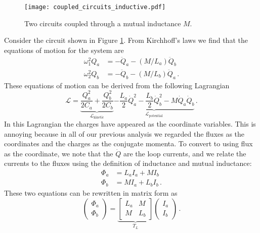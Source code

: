 
\begin{figure}
\begin{centering}
\texttt{[image: coupled\_circuits\_inductive.pdf]}
\par\end{centering}
\caption{Two circuits coupled through a mutual inductance $M$.}
\label{Fig:coupledCircuits_inductive}
\end{figure}

Consider the circuit shown in Figure \ref{Fig:coupledCircuits_inductive}.
From Kirchhoff's laws we find that the equations of motion for the system are
\begin{align}
  \omega_1^2 Q_a &= -\ddot{Q}_a - \left(M/L_a\right) \ddot{Q}_b \nonumber \\
  \omega_2^2 Q_b &= -\ddot{Q}_b - \left(M/L_b\right) \ddot{Q}_a
  \, .
\end{align}
These equations of motion can be derived from the following Lagrangian
\begin{equation}
  \mathcal{L} =
  \underbrace{
      \frac{Q_a^2}{2 C_a} + \frac{Q_b^2}{2 C_b}
  }_{\mathcal{L}_\text{kinetic}}
  \underbrace{
    - \frac{L_a}{2}\dot{Q}_a^2
    - \frac{L_b}{2}\dot{Q}_b^2
    - M \dot{Q}_a \dot{Q}_b
  }_{\mathcal{L}_\text{potential}}
  \, . \label{eq:sec.coupling.subsec.inductiveCoupling:Lagrangian}
\end{equation}
In this Lagrangian the charges have appeared as the coordinate variables.
This is annoying because in all of our previous analysis we regarded the fluxes as the coordinates and the charges as the conjugate momenta.
To convert to using flux as the coordinate, we note that the $\dot{Q}$ are the loop currents, and we relate the currents to the fluxes using the definition of inductance and mutual inductance:
\begin{align*}
  \Phi_a &= L_a I_a + M I_b \\
  \Phi_b &= M I_a + L_b I_b \, .
\end{align*}
These two equations can be rewritten in matrix form as
\begin{equation*}
  \left( \begin{array}{c} \Phi_a \\ \Phi_b \end{array} \right)
  =
  \underbrace{
    \left[ \begin{array}{cc} L_a & M \\ M & L_b \end{array} \right]
  }_{T_L}
  \left( \begin{array}{c} I_a \\ I_b \end{array} \right) \, . \label{eq:sec.coupling.subsec.inductiveCoupling:fluxToI}
\end{equation*}
